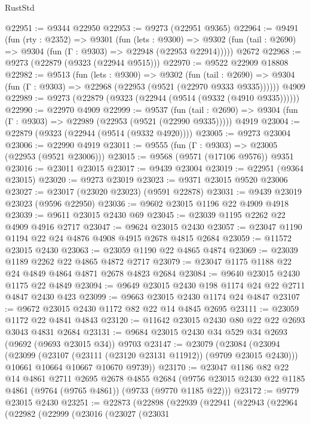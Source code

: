 \begin{lexlean}{RustStd}
\begin{coremodule}
@22951 := @9344 @22950
@22953 := @9273 (@22951 @9365)
@22964 := @9491
    (fun (rty : @2352) =>
    @9301
      (fun (lets : @9300) =>
      @9302 (fun (tail : @2690) => @9304 (fun (Γ : @9303) => @22948 (@22953 @22914)))))
    @2672
@22968 := @9273 (@22879 (@9323 (@22944 @9515)))
@22970 := @9522 @22909 @18808
@22982 := @9513
    (fun (lets : @9300) =>
    @9302
      (fun (tail : @2690) =>
      @9304 (fun (Γ : @9303) => @22968 (@22953 (@9521 (@22970 @9333 @9335))))))
    @4909
@22989 := @9273 (@22879 (@9323 (@22944 (@9514 (@9332 (@4910 @9335))))))
@22990 := @22970 @4909
@22999 := @9537
    (fun (tail : @2690) => @9304 (fun (Γ : @9303) => @22989 (@22953 (@9521 (@22990 @9335)))))
    @4919
@23004 := @22879 (@9323 (@22944 (@9514 (@9332 @4920))))
@23005 := @9273 @23004
@23006 := @22990 @4919
@23011 := @9555 (fun (Γ : @9303) => @23005 (@22953 (@9521 @23006)))
@23015 := @9568 (@9571 (@17106 @9576)) @9351
@23016 := @23011 @23015
@23017 := @9439 @23004
@23019 := @22951 (@9364 @23015)
@23020 := @9273 @23019
@23023 := @9371 @23015 @9520 @23006
@23027 := @23017 (@23020 @23023) (@9591 @22878)
@23031 := @9439 @23019 @23023 (@9596 @22950)
@23036 := @9602 @23015 @1196 @22 @4909 @4918
@23039 := @9611 @23015 @2430 @69
@23045 := @23039 @1195 @2262 @22 @4909 @4916 @2717
@23047 := @9624 @23015 @2430
@23057 := @23047 @1190 @1194 @22 @24 @4876 @4908 @4915 @2678 @4815 @2684
@23059 := @11572 @23015 @2430
@23063 := @23059 @1190 @22 @4865 @4874
@23069 := @23039 @1189 @2262 @22 @4865 @4872 @2717
@23079 := @23047 @1175 @1188 @22 @24 @4849 @4864 @4871 @2678 @4823 @2684
@23084 := @9640 @23015 @2430 @1175 @22 @4849
@23094 := @9649 @23015 @2430 @198 @1174 @24 @22 @2711 @4847 @2430 @423
@23099 := @9663 @23015 @2430 @1174 @24 @4847
@23107 := @9672 @23015 @2430 @1172 @82 @22 @14 @4845 @2695
@23111 := @23059 @1172 @22 @4841 @4843
@23120 := @11642 @23015 @2430 @80 @22 @22 @2693 @3043 @4831 @2684
@23131 := @9684 @23015 @2430 @34 @529 @34 @2693 (@9692 (@9693 @23015 @34)) @9703
@23147 := @23079
    (@23084
      (@23094
        (@23099 (@23107 (@23111 (@23120 @23131 @11912)) (@9709 @23015 @2430)))
        @10661
        @10664
        @10667
        @10670
        @9739))
@23170 := @23047
    @1186
    @82
    @22
    @14
    @4861
    @2711
    @2695
    @2678
    @4855
    @2684
    (@9756 @23015 @2430 @22 @1185 @4861 (@9764 (@9765 @4861)) (@9733 (@9770 @1185 @22)))
@23172 := @9779 @23015 @2430
@23251 := @22873
    (@22898
      (@22939
        (@22941
          (@22943
            (@22964
              (@22982
                (@22999
                  (@23016
                    (@23027
                      (@23031

\end{coremodule}
\end{lexlean}
